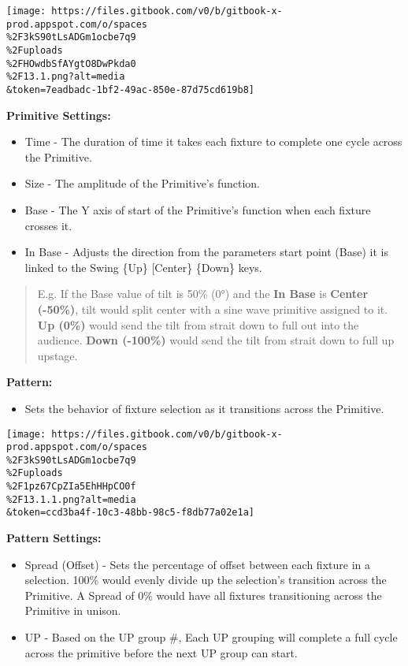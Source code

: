 \documentclass[
]{article}
\providecommand{\tightlist}{%
  \setlength{\itemsep}{0pt}\setlength{\parskip}{0pt}}
\begin{document}
\texttt{[image: https://files.gitbook.com/v0/b/gitbook-x-prod.appspot.com/o/spaces\\\%2F3kS90tLsADGm1ocbe7q9\\\%2Fuploads\\\%2FHOwdbSfAYgtO8DwPkda0\\\%2F13.1.png?alt=media\\\&token=7eadbadc-1bf2-49ac-850e-87d75cd619b8]}

\textbf{Primitive Settings:}

\begin{itemize}
\item
  Time - The duration of time it takes each fixture to complete one cycle across the Primitive.
\item
  Size - The amplitude of the Primitive's function.
\item
  Base - The Y axis of start of the Primitive's function when each fixture crosses it.
\item
  In Base - Adjusts the direction from the parameters start point (Base) it is linked to the Swing \{Up\} {[}Center\} \{Down\} keys.
\end{itemize}

\begin{quote}
E.g. If the Base value of tilt is 50\% (0°) and the \textbf{In Base} is \textbf{Center (-50\%)}, tilt would split center with a sine wave primitive assigned to it. \textbf{Up (0\%)} would send the tilt from strait down to full out into the audience. \textbf{Down (-100\%)} would send the tilt from strait down to full up upstage.
\end{quote}

\textbf{Pattern:}

\begin{itemize}
\tightlist
\item
  Sets the behavior of fixture selection as it transitions across the Primitive.
\end{itemize}

\texttt{[image: https://files.gitbook.com/v0/b/gitbook-x-prod.appspot.com/o/spaces\\\%2F3kS90tLsADGm1ocbe7q9\\\%2Fuploads\\\%2F1pz67CpZIa5EhHHpCO0f\\\%2F13.1.1.png?alt=media\\\&token=ccd3ba4f-10c3-48bb-98c5-f8db77a02e1a]}

\textbf{Pattern Settings:}

\begin{itemize}
\item
  Spread (Offset) - Sets the percentage of offset between each fixture in a selection. 100\% would evenly divide up the selection's transition across the Primitive. A Spread of 0\% would have all fixtures transitioning across the Primitive in unison.
\item
  UP - Based on the UP group \#, Each UP grouping will complete a full cycle across the primitive before the next UP group can start.
\end{itemize}
\end{document}
